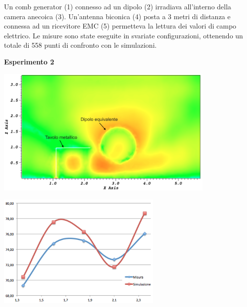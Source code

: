 \documentclass[portrait,fontscale=0.35,paperwidth=800mm, paperheight=1200mm]{baposter}
\begin{document}
\begin{poster}
{\begin{center}
\begin{minipage}{0.32\textwidth}
        \end{minipage}
        \end{center}
        \vspace{3mm}
Un comb generator (1) connesso ad un dipolo (2) irradiava all'interno della camera anecoica (3). Un'antenna biconica (4) posta a 3 metri di distanza e connessa ad un ricevitore EMC (5) permetteva la lettura dei valori di campo elettrico. Le misure sono state eseguite in svariate configurazioni, ottenendo un totale di 558 punti di confronto con le simulazioni.

\vspace{3mm}
{\textbf{Esperimento 2}}

    \hfill
    \begin{minipage}[b]{0.48\textwidth}
        \begin{center}
            \includegraphics[width=0.8\textwidth]{img/camera.png}%
        \end{center}
    \end{minipage}
    \hfill
    \begin{minipage}[b]{0.48\textwidth}
        \begin{center}
            \includegraphics[width=0.6\textwidth]{img/campo}%
        \end{center}
    \end{minipage}
    \hfill
    \vspace{3mm}

}
\end{poster}
\end{document}
